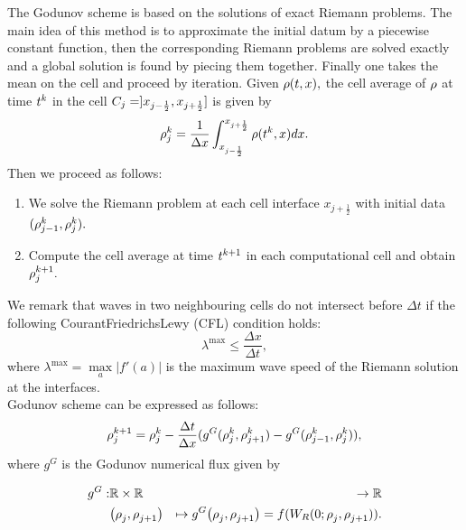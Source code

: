 		The Godunov scheme is based on the solutions of exact Riemann problems. The main idea of this method is to approximate the initial datum by a piecewise constant function, then the corresponding Riemann problems are solved exactly and a global solution is found by piecing them together. Finally one takes the mean on the cell and proceed by iteration. Given $\rho(t,x),$ the cell average of $\rho$ at time $t^{k}$ in the cell $C_{j}=]x_{j-\frac{1}{2}},x_{j+\frac{1}{2}}]$ is given by 
		\begin{equation}
			\rho_{j}^{k}=\dfrac{1}{\Delta x}\int_{x_{j-\frac{1}{2}}}^{x_{j+\frac{1}{2}}}\rho(t^{k},x)dx.\label{eq:godproj}
		\end{equation}
		Then we proceed as follows:
		\begin{enumerate}
			\item We solve the Riemann problem at each cell interface $x_{j+\frac{1}{2}}$ with initial data $(\rho^{k}_{j-1},\rho^{k}_{j}).$
			\item Compute the cell average at time $t^{k +1}$ in each computational cell and obtain $\rho^{k +1}_{j}.$ 
		\end{enumerate}
				
		We remark that waves in two neighbouring cells do not intersect before $\Delta t$ if the following Courant\textendash{}Friedrichs\textendash{}Lewy (CFL) condition holds:
		\begin{equation}\label{eq:CFL}
			\lambda^{\max}\le\frac{\Delta x}{\Delta t},
		\end{equation}
		where $\lambda^{\max}=\underset{a}{\max}|f'\left(a\right)|$ is the maximum wave speed of the Riemann solution at the interfaces.\\
		Godunov scheme can be expressed as follows:
		\begin{equation}
			\rho_{j}^{k+1}=\rho_{j}^{k}-\frac{\Delta t}{\Delta x}(g^{G}(\rho_{j}^{k},\rho_{j+1}^{k})-g^{G}(\rho_{j-1}^{k},\rho_{j}^{k})),\label{eq:godscheme}
		\end{equation}
		where $g^{G}$ is the Godunov numerical flux given by
				
		\begin{eqnarray*}
			\god: & \mathbb{R}\times\mathbb{R} & \rightarrow\mathbb{R}\\
			& \left(\discrete{\xind}{},\discrete{\xind+1}{}\right) & \mapsto\god\left(\discrete{\xind}{},\discrete{\xind+1}{}\right)=f(W_{R}(0;\discrete{\xind}{},\discrete{\xind+1}{})).
		\end{eqnarray*}
				
